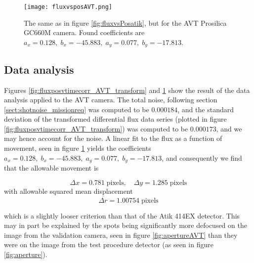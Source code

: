 \documentclass[../main.tex]{subfiles}
\begin{document}
\begin{figure}
	\centering
	\texttt{[image: fluxvsposAVT.png]}
	\caption{The same as in figure \ref{fig:fluxvsPosatik}, but for the AVT Prosilica GC660M camera. Found coefficients are $a_x = 0.128,\;b_x =  -45.883,\;a_y = 0.077,\;b_y = -17.813$.}
	\label{fig:fluxvsPosAVT}
\end{figure}

\subsection{Data analysis}
Figures \ref{fig:fluxposvtimecorr_AVT_transform} and \ref{fig:fluxvsPosAVT} show the result of the data analysis applied to the AVT camera. The total noise, following section \ref{sect:shotnoise_missionreq} was computed to be $0.000184$, and the standard deviation of the transformed differential flux data series (plotted in figure \ref{fig:fluxposvtimecorr_AVT_transform}) was computed to be $0.000173$, and we may hence account for the noise. A linear fit to the flux as a function of movement, seen in figure \ref{fig:fluxvsPosAVT} yields the coefficients $a_x = 0.128,\;b_x =  -45.883,\;a_y = 0.077,\;b_y = -17.813$, and consequently we find that the allowable movement is

\begin{equation}
	\Delta x =  0.781 \;\text{pixels}, \quad
	\Delta y =  1.285 \;\text{pixels}
\end{equation}
with allowable squared mean displacement
\begin{equation}
	\overline{\Delta r} = 1.00754 \;\text{pixels}
\end{equation}

which is a slightly looser criterion than that of the Atik 414EX detector. This may in part be explained by the spots being significantly more defocused on the image from the validation camera, seen in figure \ref{fig:apertureAVT} than they were on the image from the test procedure detector (as seen in figure \ref{fig:aperture}).

\clearpage
\end{document}
